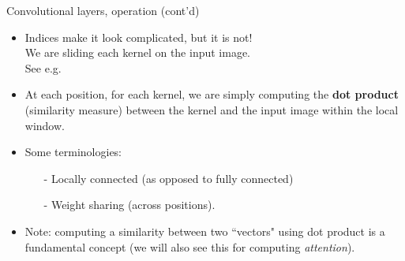 \begin{frame}{Convolutional layers, operation (cont'd)}
\begin{itemize}
\item Indices make it look complicated, but it is not!\\
 We are sliding each kernel on the input image.\\
See e.g. 
\item At each position, for each kernel, we are simply
computing the \textbf{dot product} (similarity measure) between the kernel and the input image within the local window.
\item Some terminologies: 
\begin{itemize}
\item[-] Locally connected (as opposed to fully connected)
\item[-] Weight sharing (across positions).
\end{itemize}
\item Note: computing a similarity between two ``vectors" using dot product is a fundamental concept (we will also see this for computing \textit{attention}). 
\end{itemize}
\end{frame}

